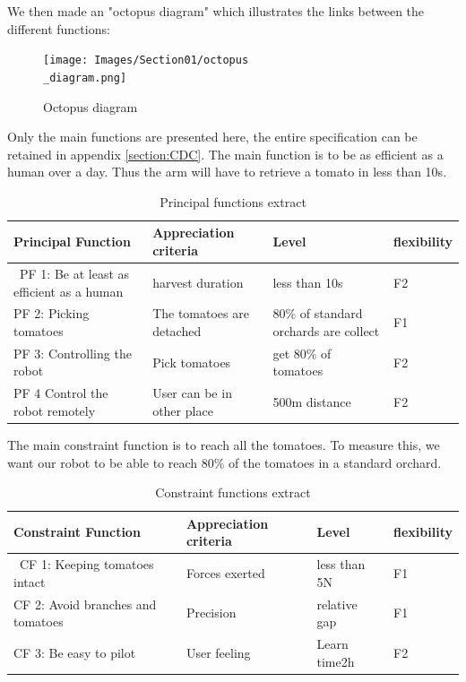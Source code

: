 We then made an "octopus diagram" which illustrates the links between the different functions: 
\begin{figure}[ht]
    \centering
    \texttt{[image: Images/Section01/octopus\\\_diagram.png]}
    \caption{Octopus diagram}
    \label{fig:octopus}
\end{figure}

\bigbreak
Only the main functions are presented here, the entire specification can be retained in appendix \ref{section:CDC}. The main function is to be as efficient as a human over a day. Thus the arm will have to retrieve a tomato in less than 10s. 

\begin{table}[ht]
    \centering  
    \begin{tabular}{|p{3cm} | p{3cm} | p{3cm} | p{3cm} |} 
        \hline
        \textbf{Principal Function} & \textbf{Appreciation criteria} & \textbf{Level} & \textbf{flexibility} \\ [0.5ex] 
        \hline\
        PF 1: Be at least as efficient as a human & harvest duration & less than 10s & F2 \\ 
        \hline
        PF 2: Picking tomatoes & The tomatoes are detached & 80\% of standard orchards are collect & F1 \\
        \hline
        PF 3: Controlling the robot & Pick tomatoes & get 80\% of tomatoes & F2 \\
        \hline
        PF 4 Control the robot remotely  & User can be in other place & 500m distance & F2 \\
        \hline
    \end{tabular}
    \caption{Principal functions extract}
\end{table}
\FloatBarrier

\bigbreak
The main constraint function is to reach all the tomatoes. To measure this, we want our robot to be able to reach 80\% of the tomatoes in a standard orchard. 

\begin{table}[H]
    \centering    
    \begin{tabular}{|p{3cm} | p{3cm} | p{3cm} | p{3cm} |} 
        \hline
        \textbf{Constraint Function} & \textbf{Appreciation criteria} & \textbf{Level} & \textbf{flexibility} \\ [0.5ex] 
        \hline\
        CF 1: Keeping tomatoes intact & Forces exerted & less than 5N & F1 \\ 
        \hline
        CF 2: Avoid branches and tomatoes & Precision & relative gap\less1cm & F1 \\
        \hline
        CF 3: Be easy to pilot & User feeling & Learn time\less2h & F2 \\
        \hline
    \end{tabular}
    \caption{Constraint functions extract}
\end{table}
